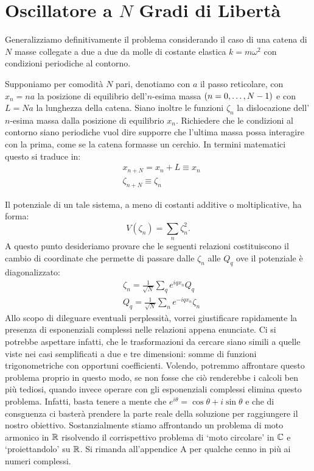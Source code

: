 \section{Oscillatore a $N$ Gradi di Libert\`a}
    Generalizziamo definitivamente il problema considerando il caso di una catena di $N$ masse collegate a due a due da molle di costante elastica $k=m\omega^2$ con condizioni periodiche al contorno. \par Supponiamo per comodit\`a $N$ pari, denotiamo con $a$ il passo reticolare, con $x_n=na$ la posizione di equilibrio dell'$n$-esima massa $\qty(n=0,\dots,N-1)$ e con $L=Na$ la lunghezza della catena. Siano inoltre le funzioni $\zeta_n$ la dislocazione dell'$n$-esima massa dalla posizione di equilibrio $x_n$. Richiedere che le condizioni al contorno siano periodiche vuol dire supporre che l'ultima massa possa interagire con la prima, come se la catena formasse un cerchio. In termini matematici questo si traduce in:
    \begin{align}
        &x_{n+N}=x_n+L\equiv x_n \label{eq:period:1}\\
        &\zeta_{n+N}\equiv \zeta_n \label{eq:period:2}
    \end{align} \par
    Il potenziale di un tale sistema, a meno di costanti additive o moltiplicative, ha forma:
    \begin{equation}
        V(\zeta_n)=\sum_n\zeta_n^2.
        \label{eq:potenziale:2}
    \end{equation}
    A questo punto desideriamo provare che le seguenti relazioni costituiscono il cambio di coordinate che permette di passare dalle $\zeta_n$ alle $Q_q$ ove il potenziale \`e diagonalizzato:
    \begin{align}
        &\zeta_n=\frac{1}{\sqrt{N}}\sum_q e^{iqx_n}Q_q \label{eq:cambio:1}\\
        &Q_q=\frac{1}{\sqrt{N}}\sum_n e^{-iqx_n}\zeta_n \label{eq:cambio:2}
    \end{align}
    Allo scopo di dileguare eventuali perplessit\`a, vorrei giustificare rapidamente la presenza di esponenziali complessi nelle relazioni appena enunciate. Ci si potrebbe aspettare infatti, che le trasformazioni da cercare siano simili a quelle viste nei casi semplificati a due e tre dimensioni: somme di funzioni trigonometriche con opportuni coefficienti. Volendo, potremmo affrontare questo problema proprio in questo modo, se non fosse che ci\`o renderebbe i calcoli ben pi\`u tediosi, quando invece operare con gli esponenziali complessi elimina questo problema. Infatti, basta tenere a mente che $e^{i\theta}=\cos\theta+i\sin\theta$ e che di consguenza ci baster\`a prendere la parte reale della soluzione per raggiungere il nostro obiettivo. Sostanzialmente stiamo affrontando un problema di moto armonico in $\mathbb{R}$ risolvendo il corrispettivo problema di `moto circolare' in $\mathbb{C}$ e `proiettandolo' su $\mathbb{R}$. Si rimanda all'appendice A per qualche cenno in pi\`u ai numeri complessi.

